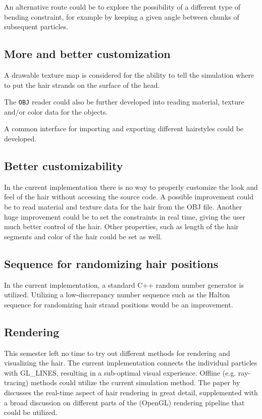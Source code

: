 \documentclass[sigplan,screen,nonacm]{acmart}
\begin{document}
An alternative route could be to explore the possibility of a different type of
bending constraint, for example by keeping a given angle between chunks of
subsequent particles.

\subsection{More and better customization} 
\label{section:futureCustomization}
A drawable texture map is considered for the ability to tell the simulation
where to put the hair strands on the surface of the head.

The \texttt{OBJ} reader could also be further developed into reading material,
texture and/or color data for the objects.

A common interface for importing and exporting different hairstyles could be
developed.

\subsection{Better customizability}
In the current implementation there is no way to properly customize the look and
feel of the hair without accessing the source code. A possible improvement could
be to read material and texture data for the hair from the OBJ file. Another
huge improvement could be to set the constraints in real time, giving the user
much better control of the hair. Other properties, such as length of the hair
segments and color of the hair could be set as well.

\subsection{Sequence for randomizing hair positions}
\label{section:futureHalton}
In the current implementation, a standard C++ random number generator is
utilized. Utilizing a low-discrepancy number sequence such as the Halton
sequence for randomizing hair strand positions would be an improvement.

\subsection{Rendering}
This semester left no time to try out different methods for rendering and
visualizing the hair. The current implementation connects the individual
particles with GL\_LINES, resulting in a sub-optimal visual experience. Offline
(e.g. ray-tracing) methods could utilize the current simulation method. 
The paper by \citet{RappRealTime} discusses the real-time aspect of hair
rendering in great detail, supplemented with a broad discussion on different
parts of the (OpenGL) rendering pipeline that could be utilized.
\end{document}
